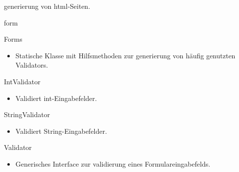 \documentclass[parskip=full]{scrartcl}
\newcommand{\code}[1]{{\ttfamily #1}}
\begin{document}
\begin{itemPackage}
\begin{itemize}
  generierung von \code{html}-Seiten.
\end{itemize}
\item form
\begin{itemClass}
\item Forms
\begin{itemize}
  \item Statische Klasse mit Hilfsmethoden zur generierung von häufig genutzten
  \code{Validators}.
\end{itemize}
\item IntValidator
\begin{itemize}
  \item Validiert \code{int}-Eingabefelder.
\end{itemize}
\item StringValidator
\begin{itemize}
  \item Validiert \code{String}-Eingabefelder.
\end{itemize}
\item Validator
\begin{itemize}
  \item Generisches Interface zur validierung eines Formulareingabefelds.
\end{itemize}
\end{itemClass}
\end{itemPackage}
\end{document}
